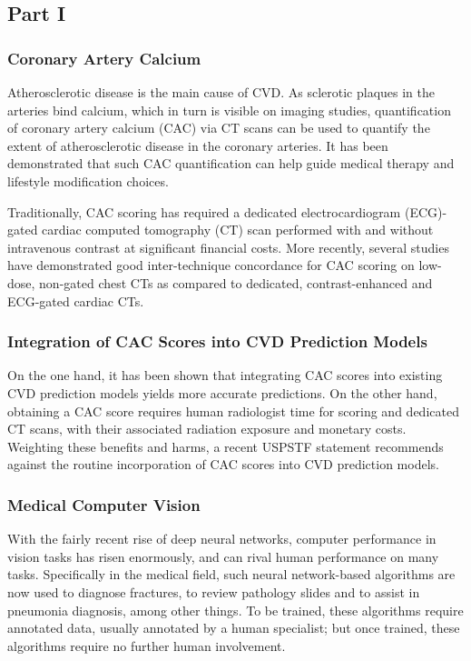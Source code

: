 \documentclass[a4paper,12pt]{article}
\begin{document}
		\subsection{Part I}
		
			\subsubsection{Coronary Artery Calcium}

			Atherosclerotic disease is the main cause of CVD. As sclerotic plaques in the arteries bind calcium, which in turn is visible on imaging studies, quantification of coronary artery calcium (CAC) via CT scans can be used to quantify the extent of atherosclerotic disease in the coronary arteries. It has been demonstrated that such CAC quantification can help guide medical therapy and lifestyle modification choices\cite{Takx2015,Elias-Smale2010,Erbel2010,Vliegenthart2005,Becker2005}.
			
			Traditionally, CAC scoring has required a dedicated electrocardiogram (ECG)-gated cardiac computed tomography (CT) scan performed with and without intravenous contrast at significant financial costs\cite{Halpern2010}. More recently, several studies have demonstrated good inter-technique concordance for CAC scoring on low-dose, non-gated chest CTs as compared to dedicated, contrast-enhanced and ECG-gated cardiac CTs\cite{Wu2008,Budoff2011}.
			
			\subsubsection{Integration of CAC Scores into CVD Prediction Models}
			
			On the one hand, it has been shown that integrating CAC scores into existing CVD prediction models yields more accurate predictions\cite{Polonsky2010,Greenland2004}. On the other hand, obtaining a CAC score requires human radiologist time for scoring and dedicated CT scans, with their associated radiation exposure and monetary costs. Weighting these benefits and harms, a recent USPSTF statement recommends against the routine incorporation of CAC scores into CVD prediction models\cite{Force2018}.
			
			\subsubsection{Medical Computer Vision}
			
			With the fairly recent rise of deep neural networks, computer performance in vision tasks has risen enormously, and can rival human performance on many tasks. Specifically in the medical field, such neural network-based algorithms are now used to diagnose fractures\cite{Lindsey2018}, to review pathology slides\cite{EhteshamiBejnordi2018} and to assist in pneumonia diagnosis\cite{Abiyev2018}, among other things. To be trained, these algorithms require annotated data, usually annotated by a human specialist; but once trained, these algorithms require no further human involvement.
			
\end{document}
